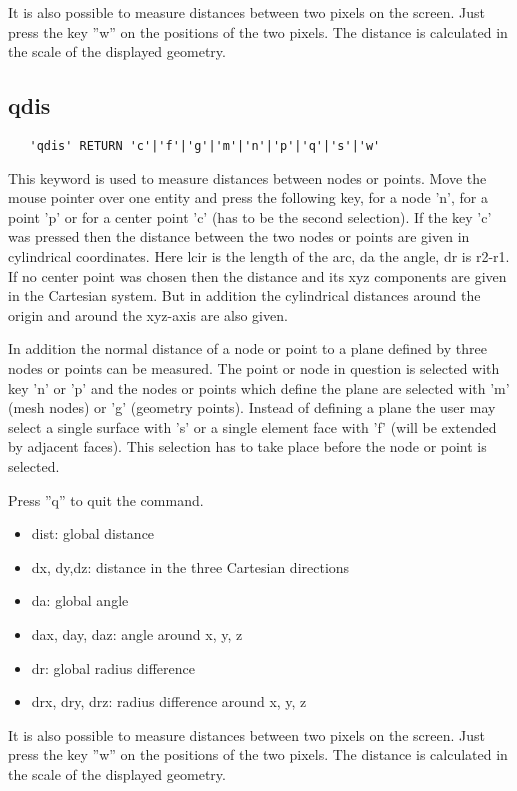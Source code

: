 \documentclass{article}
\begin{document}
It is also possible to measure distances between two pixels on the screen. Just press the key ''w'' on the positions of the two pixels. The distance is calculated in the scale of the displayed geometry.

\subsection{\label{qdis}qdis}
\begin{verbatim}
   'qdis' RETURN 'c'|'f'|'g'|'m'|'n'|'p'|'q'|'s'|'w' 
\end{verbatim}
This keyword is used to measure distances between nodes or points. Move the mouse pointer over one entity and press the following key, for a node 'n', for a point 'p' or for a center point 'c' (has to be the second selection). If the key 'c' was pressed then the distance between the two nodes or points are given in cylindrical coordinates. Here lcir is the length of the arc, da the angle, dr is r2-r1. If no center point was chosen then the distance and its xyz components are given in the Cartesian system. But in addition the cylindrical distances around the origin and around the xyz-axis are also given.

In addition the normal distance of a node or point to a plane defined by three nodes or points can be measured. The point or node in question is selected with key 'n' or 'p' and the nodes or points which define the plane are selected with 'm' (mesh nodes) or 'g' (geometry points). Instead of defining a plane the user may select a single surface with 's' or a single element face with 'f' (will be extended by adjacent faces). This selection has to take place before the node or point is selected.

Press ''q'' to quit the command.

\begin{itemize}
\item dist: global distance
\item dx, dy,dz: distance in the three Cartesian directions
\item da: global angle
\item dax, day, daz: angle around x, y, z
\item dr: global radius difference
\item drx, dry, drz: radius difference around x, y, z
\end{itemize}

It is also possible to measure distances between two pixels on the screen. Just press the key ''w'' on the positions of the two pixels. The distance is calculated in the scale of the displayed geometry.
\end{document}
